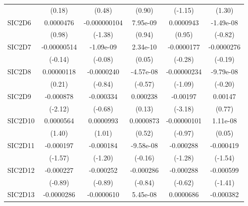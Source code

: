 \begin{table}[htbp]
\begin{tabular}{l*{5}{c}}
            &      (0.18)         &      (0.48)         &      (0.90)         &     (-1.15)         &      (1.30)         \\
SIC2D6      &   0.0000476         &-0.000000104         &    7.95e-09         &   0.0000943         &   -1.49e-08         \\
            &      (0.98)         &     (-1.38)         &      (0.94)         &      (0.95)         &     (-0.82)         \\
SIC2D7      & -0.00000514         &   -1.09e-09         &    2.34e-10         &  -0.0000177         &  -0.0000276         \\
            &     (-0.14)         &     (-0.08)         &      (0.05)         &     (-0.28)         &     (-0.19)         \\
SIC2D8      &  0.00000118         &  -0.0000240         &   -4.57e-08         & -0.00000234         &   -9.79e-08         \\
            &      (0.21)         &     (-0.84)         &     (-0.57)         &     (-1.09)         &     (-0.20)         \\
SIC2D9      &   -0.000878\sym{*}  &   -0.000334         &    0.000238         &    -0.00197\sym{**} &     0.00147         \\
            &     (-2.12)         &     (-0.68)         &      (0.13)         &     (-3.18)         &      (0.77)         \\
SIC2D10     &   0.0000564         &   0.0000993         &   0.0000873         & -0.00000101         &    1.11e-08         \\
            &      (1.40)         &      (1.01)         &      (0.52)         &     (-0.97)         &      (0.05)         \\
SIC2D11     &   -0.000197         &   -0.000184         &   -9.58e-08         &   -0.000288         &   -0.000419         \\
            &     (-1.57)         &     (-1.20)         &     (-0.16)         &     (-1.28)         &     (-1.54)         \\
SIC2D12     &   -0.000227         &   -0.000252         &   -0.000286         &   -0.000288         &   -0.000599         \\
            &     (-0.89)         &     (-0.89)         &     (-0.84)         &     (-0.62)         &     (-1.41)         \\
SIC2D13     &  -0.0000286         &  -0.0000610         &    5.45e-08         &   0.0000686         &   -0.000382         \\

\end{tabular}
\end{table}
